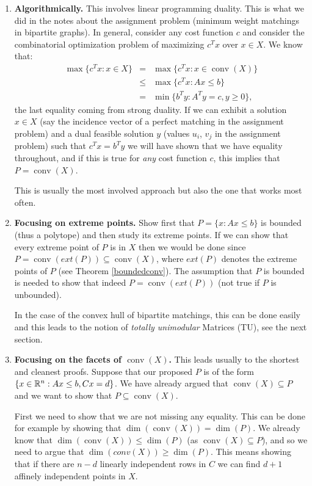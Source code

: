 \documentclass[12pt]{article}
\newcommand{\conv}{\operatorname{conv}}
\begin{document}
\begin{enumerate}
\item
{\bf Algorithmically.} This involves linear programming duality. This
is what we did in the notes  about the assignment problem (minimum
weight matchings in bipartite graphs). In general, consider any cost
function $c$ and consider the combinatorial optimization problem of
maximizing $c^Tx$ over $x\in X$. We know that:
\begin{eqnarray*} 
\max\{c^T x: x\in X\} & = & \max\{c^Tx: x\in \conv(X)\}\\ &  \leq  & \max\{c^T x:
Ax \leq b\} \\
& =  &\min \{b^T y: A^Ty=c, y\geq 0\},
\end{eqnarray*} the last equality
coming from strong duality. If we can exhibit a solution $x\in X$
(say the incidence vector of a perfect matching in the assignment problem) and a dual feasible
solution $y$ (values $u_i$, $v_j$ in the assignment problem) such that
$c^Tx=b^Ty$ we will have shown that we have equality throughout, and
if this is true for {\it any} cost function $c$, this implies that  $P =
\conv(X)$. 

This is usually the most involved approach but also the one that works
most often. 

\item {\bf Focusing on extreme points.} Show first that $P=\{x: Ax
  \leq b\}$ is bounded (thus a polytope) and then study its extreme
  points. If we can show that every extreme point of $P$ is in $X$
  then we would be done since $P=\conv(ext(P))\subseteq \conv(X)$, where
  $ext(P)$ denotes the extreme points of $P$ (see Theorem
  \ref{boundedconv}). The assumption that $P$ is bounded is needed to
  show that indeed $P=\conv(ext(P))$ (not true if $P$ is unbounded).

In the case of the convex hull of bipartite matchings, this can be
done easily and this leads to the notion of {\it totally unimodular}
Matrices (TU), see the next section. 

\item
{\bf Focusing on the facets of $\conv(X)$.} This leads usually to the
shortest and cleanest proofs. Suppose that our proposed $P$ is of the
form $\{x\in {\mathbb R}^n: Ax\leq b, Cx=d\}$. We have already argued
that $\conv(X) \subseteq P$ and we want to show that $P\subseteq
\conv(X)$. 

First we need to show that we are not missing any equality. This can
be done for example by showing that $\dim(\conv(X))=\dim(P)$. We already know that $\dim(\conv(X))\leq \dim(P)$ (as $\conv(X)\subseteq P$), and so we need to argue that $\dim(conv(X))\geq \dim(P)$. This means showing that 
if there are $n-d$ linearly independent rows in
$C$ we can find $d+1$ affinely independent points in $X$.


\end{enumerate}
\end{document}
